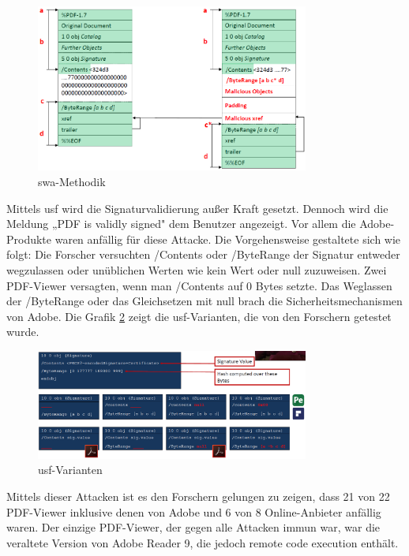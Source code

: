 \begin{figure}[!htb]
	\centering
	\includegraphics[width=0.8\textwidth]{"images/sig_wrap_attack.png"}
	\caption{\gls{swa}-Methodik \cite{ccc-break-pdf-slides}}
	\label{fig:swa}
\end{figure}

Mittels \gls{usf} wird die Signaturvalidierung außer Kraft gesetzt. Dennoch wird die Meldung „PDF is validly signed" dem Benutzer angezeigt. Vor allem die Adobe-Produkte waren anfällig für diese Attacke. Die Vorgehensweise gestaltete sich wie folgt: Die Forscher versuchten /Contents oder /ByteRange der Signatur entweder wegzulassen oder unüblichen Werten wie kein Wert oder null zuzuweisen. Zwei PDF-Viewer versagten, wenn man /Contents auf 0 Bytes setzte. Das Weglassen der /ByteRange oder das Gleichsetzen mit null brach die Sicherheitsmechanismen von Adobe. \cite{ccc-break-pdf} Die Grafik \ref{fig:usf} zeigt die \gls{usf}-Varianten, die von den Forschern getestet wurde.
\par

\begin{figure}[!htb]
	\centering
	\includegraphics[width=0.8\textwidth]{"images/univ_sig_forgery.png"}
	\caption{\gls{usf}-Varianten \cite{ccc-break-pdf-slides}}
	\label{fig:usf}
\end{figure}

Mittels dieser Attacken ist es den Forschern gelungen zu zeigen, dass 21 von 22 PDF-Viewer inklusive denen von Adobe und 6 von 8 Online-Anbieter anfällig waren. Der einzige PDF-Viewer, der gegen alle Attacken immun war, war die veraltete Version von Adobe Reader 9, die jedoch remote code execution enthält. \cite{ccc-break-pdf}